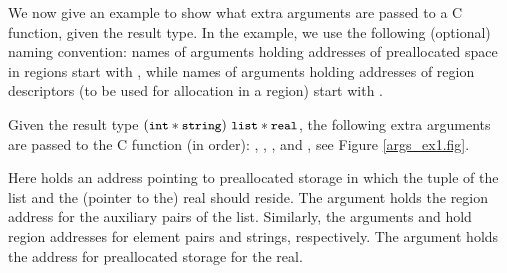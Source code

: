 \documentclass[12pt]{book}
\begin{document}
We now give an example to show what extra arguments are passed to a
C function, given the result type. In the example, we use the following
(optional) naming convention:
names of arguments holding addresses of
preallocated space in regions
start with , while names of arguments
holding addresses of region descriptors (to be used for allocation in a
region) start with .
\begin{example}
  Given the result type $(\mbox{\small\ttfamily int} \ast \mbox{\small\ttfamily string}) ~\mbox{\small\ttfamily list} \ast \mbox{\small\ttfamily real}$,
  the following extra ar\-gu\-ments are passed to the C function (in order):
  , , ,  and
  , see Figure \ref{args_ex1.fig}.

  Here  holds an address pointing to preallocated storage in
  which the tuple of the list and the (pointer to the) real should reside. The
  argument  holds the region address for the auxiliary pairs of
  the list. Similarly, the arguments  and 
  hold region addresses for element pairs and strings, respectively. The
  argument  holds the address for preallocated storage for the
  real.
\end{example}
\end{document}
